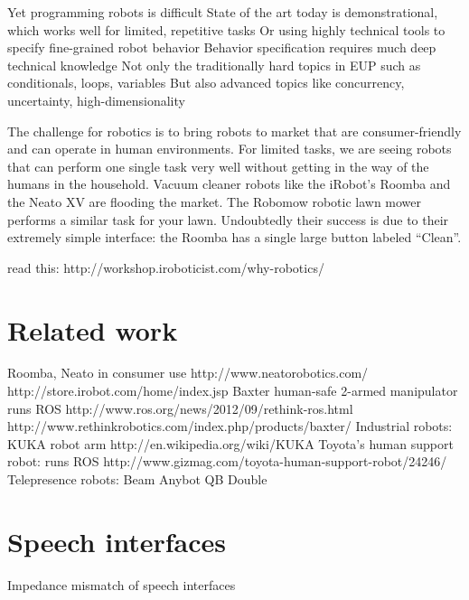\documentclass{article}
\begin{document}
	Yet programming robots is difficult
	State of the art today is demonstrational, which works well for limited, repetitive tasks
	Or using highly technical tools to specify fine-grained robot behavior
	Behavior specification requires much deep technical knowledge
	Not only the traditionally hard topics in EUP such as conditionals, loops, variables
	But also advanced topics like concurrency, uncertainty, high-dimensionality

The challenge for robotics is to bring robots to market that are consumer-friendly and can operate in human environments. For limited tasks, we are seeing robots that can perform one single task very well without getting in the way of the humans in the household. Vacuum cleaner robots like the iRobot's Roomba and the Neato XV are flooding the market. The Robomow robotic lawn mower performs a similar task for your lawn. Undoubtedly their success is due to their extremely simple interface: the Roomba has a single large button labeled ``Clean''.


read this: http://workshop.iroboticist.com/why-robotics/

\section{Related work}

Roomba, Neato in consumer use
	http://www.neatorobotics.com/
	http://store.irobot.com/home/index.jsp
Baxter human-safe 2-armed manipulator
	runs ROS
	http://www.ros.org/news/2012/09/rethink-ros.html
	http://www.rethinkrobotics.com/index.php/products/baxter/
Industrial robots:
	KUKA robot arm http://en.wikipedia.org/wiki/KUKA
Toyota's human support robot:
	runs ROS
	http://www.gizmag.com/toyota-human-support-robot/24246/
Telepresence robots:
	Beam
	Anybot QB
	Double


\section{Speech interfaces}

Impedance mismatch of speech interfaces



\end{document}
